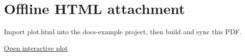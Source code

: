 \documentclass{article}
\begin{document}
\section*{Offline HTML attachment}
Import plot.html into the docs-example project, then build and sync this PDF.

\href{thoughts-html:docs-example/tex/support/html/plot.html}{Open interactive plot}
\end{document}
